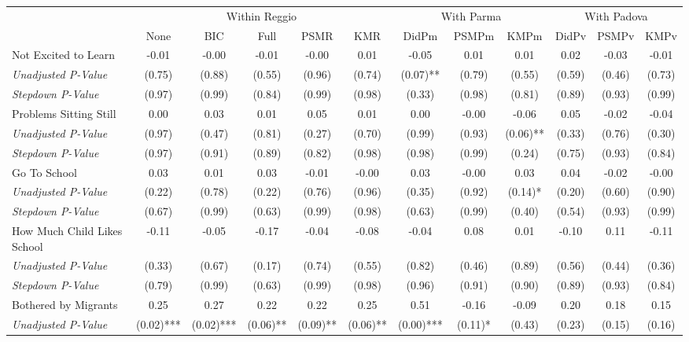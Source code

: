\begin{tabular}{l c c c c c c c c c c c}
\toprule
& \multicolumn{5}{c}{Within Reggio} & \multicolumn{3}{c}{With Parma} & \multicolumn{3}{c}{With Padova} \\\cmidrule(lr){2-6} \cmidrule(lr){7-9} \cmidrule(lr){10-12}
 & None & BIC & Full & PSMR & KMR & DidPm & PSMPm & KMPm & DidPv & PSMPv & KMPv \\
\midrule
Not Excited to Learn & -0.01 & -0.00 & -0.01 & -0.00 & 0.01 & -0.05 & 0.01 & 0.01 & 0.02 & -0.03 & -0.01 \\
\quad \textit{Unadjusted P-Value} & (0.75) & (0.88) & (0.55) & (0.96) & (0.74) & (0.07)** & (0.79) & (0.55) & (0.59) & (0.46) & (0.73) \\
\quad \textit{Stepdown P-Value} & (0.97) & (0.99) & (0.84) & (0.99) & (0.98) & (0.33) & (0.98) & (0.81) & (0.89) & (0.93) & (0.99) \\
Problems Sitting Still & 0.00 & 0.03 & 0.01 & 0.05 & 0.01 & 0.00 & -0.00 & -0.06 & 0.05 & -0.02 & -0.04 \\
\quad \textit{Unadjusted P-Value} & (0.97) & (0.47) & (0.81) & (0.27) & (0.70) & (0.99) & (0.93) & (0.06)** & (0.33) & (0.76) & (0.30) \\
\quad \textit{Stepdown P-Value} & (0.97) & (0.91) & (0.89) & (0.82) & (0.98) & (0.98) & (0.99) & (0.24) & (0.75) & (0.93) & (0.84) \\
Go To School & 0.03 & 0.01 & 0.03 & -0.01 & -0.00 & 0.03 & -0.00 & 0.03 & 0.04 & -0.02 & -0.00 \\
\quad \textit{Unadjusted P-Value} & (0.22) & (0.78) & (0.22) & (0.76) & (0.96) & (0.35) & (0.92) & (0.14)* & (0.20) & (0.60) & (0.90) \\
\quad \textit{Stepdown P-Value} & (0.67) & (0.99) & (0.63) & (0.99) & (0.98) & (0.63) & (0.99) & (0.40) & (0.54) & (0.93) & (0.99) \\
How Much Child Likes School & -0.11 & -0.05 & -0.17 & -0.04 & -0.08 & -0.04 & 0.08 & 0.01 & -0.10 & 0.11 & -0.11 \\
\quad \textit{Unadjusted P-Value} & (0.33) & (0.67) & (0.17) & (0.74) & (0.55) & (0.82) & (0.46) & (0.89) & (0.56) & (0.44) & (0.36) \\
\quad \textit{Stepdown P-Value} & (0.79) & (0.99) & (0.63) & (0.99) & (0.98) & (0.96) & (0.91) & (0.90) & (0.89) & (0.93) & (0.84) \\
Bothered by Migrants & 0.25 & 0.27 & 0.22 & 0.22 & 0.25 & 0.51 & -0.16 & -0.09 & 0.20 & 0.18 & 0.15 \\
\quad \textit{Unadjusted P-Value} & (0.02)*** & (0.02)*** & (0.06)** & (0.09)** & (0.06)** & (0.00)*** & (0.11)* & (0.43) & (0.23) & (0.15) & (0.16) \\

\end{tabular}
